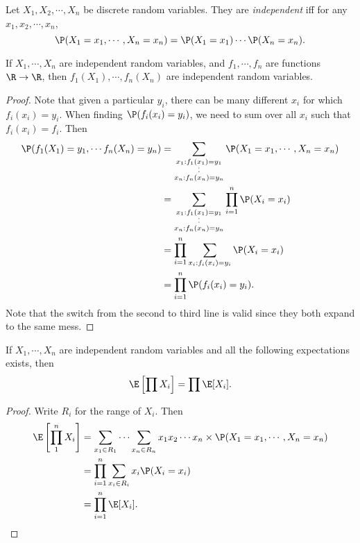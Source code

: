 \documentclass[a4paper]{article}
\begin{document}
\begin{defi}
  Let $X_1, X_2, \cdots, X_n$ be discrete random variables. They are \emph{independent} iff for any $x_1, x_2, \cdots, x_n$,
  \[
    \P(X_1 = x_1, \cdots, X_n = x_n) = \P(X_1 = x_1)\cdots \P(X_n = x_n).
  \]
\end{defi}

\begin{thm}
  If $X_1, \cdots, X_n$ are independent random variables, and $f_1, \cdots, f_n$ are functions $\R \to \R$, then $f_1(X_1), \cdots, f_n(X_n)$ are independent random variables.
\end{thm}

\begin{proof}
  Note that given a particular $y_i$, there can be many different $x_i$ for which $f_i(x_i) = y_i$. When finding $\P(f_i(x_i)= y_i)$, we need to sum over all $x_i$ such that $f_i(x_i) = f_i$. Then
  \begin{align*}
    \P(f_1(X_1) = y_1, \cdots f_n(X_n) = y_n) &= \sum_{\substack{x_1: f_1(x_1) = y_1\\\cdot\vspace{-2pt}\\\cdot\\x_n: f_n(x_n) = y_n}} \P(X_1 = x_1, \cdots, X_n = x_n)\\
    &= \sum_{\substack{x_1: f_1(x_1) = y_1\\\cdot\vspace{-2pt}\\\cdot\\x_n: f_n(x_n) = y_n}} \prod_{i = 1}^n \P(X_i = x_i)\\
    &= \prod_{i = 1}^n \sum_{x_i:f_i(x_i) = y_i} \P(X_i = x_i)\\
    &= \prod_{i = 1}^n \P(f_i(x_i) = y_i).
  \end{align*}
  Note that the switch from the second to third line is valid since they both expand to the same mess.
\end{proof}

\begin{thm}
  If $X_1, \cdots, X_n$ are independent random variables and all the following expectations exists, then
  \[
    \E\left[\prod X_i\right] = \prod \E[X_i].
  \]
\end{thm}

\begin{proof}
  Write $R_i$ for the range of $X_i$. Then
  \begin{align*}
    \E\left[\prod_1^n X_i\right] &= \sum_{x_1\in R_1}\cdots \sum_{x_n\in R_n}x_1x_2\cdots x_n\times \P(X_1 = x_1, \cdots, X_n = x_n)\\
    &= \prod_{i = 1}^n \sum_{x_i \in R_i}x_i\P(X_i = x_i)\\
    &= \prod_{i = 1}^n \E[X_i].\qedhere
  \end{align*}
\end{proof}
\end{document}
